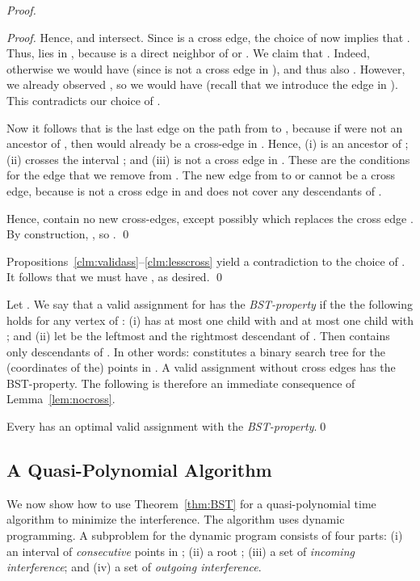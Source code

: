 \documentclass[envcountsect,envcountsame,runningheads,a4paper]{llncs}
\begin{document}
\begin{proof}
\begin{proof}
Hence,  and  intersect.
Since  is a cross edge, the choice of  now implies that
.
Thus,  lies in , because  is a direct neighbor of  or .
We claim that . Indeed, otherwise we would have 
(since  is not a cross edge in ), and thus also
. However, we already observed
, so we would have
 (recall that we introduce the edge 
in ).
This contradicts our choice of .

Now it follows that  is the last
edge on the path from  to , because if  were not an ancestor
of , then  would already be a cross-edge in .
Hence, (i)  is an ancestor of ; (ii)  crosses the interval
; and (iii)  is not a cross edge in .
These are the conditions for the edge  that
we remove from .
The new edge  from  to  or  cannot be a cross edge,
because  is not a cross edge in  and  does
not cover any descendants of .

Hence,   contain no new cross-edges,
except possibly  which replaces
the cross edge .
By construction, , so
.
\qed{}
\end{proof}

\noindent
Propositions~\ref{clm:validass}--\ref{clm:lesscross}
yield a contradiction to the choice of .
It follows that we must have , as desired.
\qed{}
\end{proof}

Let .
We say that a valid assignment  for  has the \emph{BST-property} if the
the following holds for any vertex  of :
(i)  has at most one child  with  and at most
one child  with ; and (ii) let  be the
leftmost and  the rightmost descendant of .
Then  contains only descendants of .
In other words:  constitutes a binary
search tree for the (coordinates of the) points in .
A valid assignment without cross edges has
the BST-property. The following is therefore an immediate consequence of Lemma~\ref{lem:nocross}.

\begin{theorem}\label{thm:BST}
Every  has an optimal valid assignment
with the \emph{BST-property}.\qed
\end{theorem}

\subsection{A Quasi-Polynomial Algorithm}\label{sec:qalgo}

We now show how to use Theorem~\ref{thm:BST} for
a quasi-polynomial time algorithm to minimize the
interference. The algorithm uses dynamic
programming. A subproblem  for the dynamic program consists of four
parts: (i) an interval  of \emph{consecutive} points
in ;
(ii) a root ; (iii) a set
 of \emph{incoming interference}; and (iv) a set 
of \emph{outgoing interference}.
\end{document}
